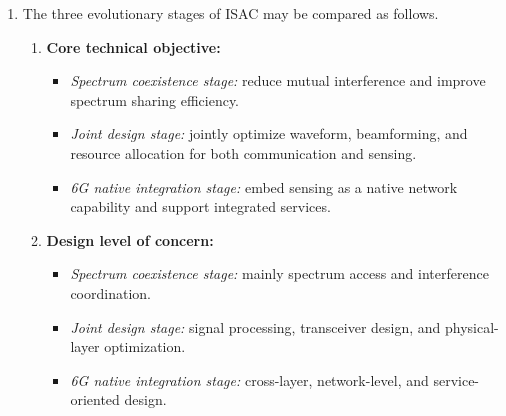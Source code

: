 \begin{enumerate}[label=\textbf{\arabic*.}, leftmargin=*]
    In terms of \emph{performance metrics}, communication systems care about rate, latency, reliability, coverage, and energy efficiency, whereas sensing systems care about detection probability, false alarm rate, range/velocity/angular resolution, estimation accuracy, and tracking stability.

    In terms of the \emph{role of the channel}, communication treats the channel as a medium that affects information delivery, but sensing treats it as the carrier of environmental information.

    These differences lead to several contradictions in ISAC design: waveform randomness versus determinism, user-oriented beams versus target illumination needs, communication-oriented resource efficiency versus sensing-oriented observability, and protocol simplicity versus sensing-aware control complexity. The challenge of ISAC is to manage these contradictions under a unified architecture.

    \item 
    The three evolutionary stages of ISAC may be compared as follows.

    \begin{enumerate}[label=(\alph*)]
        \item \textbf{Core technical objective:}
        \begin{itemize}
            \item \emph{Spectrum coexistence stage:} reduce mutual interference and improve spectrum sharing efficiency.
            \item \emph{Joint design stage:} jointly optimize waveform, beamforming, and resource allocation for both communication and sensing.
            \item \emph{6G native integration stage:} embed sensing as a native network capability and support integrated services.
        \end{itemize}

        \item \textbf{Design level of concern:}
        \begin{itemize}
            \item \emph{Spectrum coexistence stage:} mainly spectrum access and interference coordination.
            \item \emph{Joint design stage:} signal processing, transceiver design, and physical-layer optimization.
            \item \emph{6G native integration stage:} cross-layer, network-level, and service-oriented design.
        \end{itemize}


\end{enumerate}
\end{enumerate}
